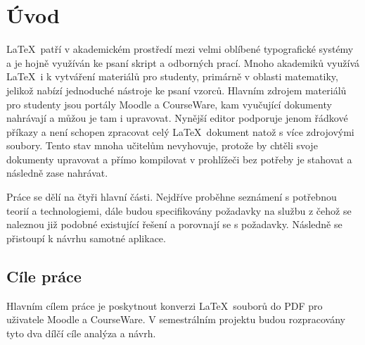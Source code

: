 \chapter{Úvod}
\LaTeX\ patří v akademickém prostředí mezi velmi oblíbené typografické systémy a je hojně využíván ke psaní skript a odborných prací. Mnoho akademiků využívá \LaTeX\ i k vytváření materiálů pro studenty, primárně v oblasti matematiky, jelikož nabízí jednoduché nástroje ke psaní vzorců. Hlavním zdrojem materiálů pro studenty jsou portály Moodle a CourseWare, kam vyučující dokumenty nahrávají a můžou je tam i upravovat. Nynější editor podporuje jenom řádkové příkazy a není schopen zpracovat celý \LaTeX\ dokument natož s více zdrojovými soubory. Tento stav mnoha učitelům nevyhovuje, protože by chtěli svoje dokumenty upravovat a přímo kompilovat v prohlížeči bez potřeby je stahovat a následně zase nahrávat. 

Práce se dělí na čtyři hlavní části. Nejdříve proběhne seznámení s potřebnou teorií a technologiemi, dále budou specifikovány požadavky na službu z čehož se naleznou již podobné existující řešení a porovnají se s požadavky. Následně se přistoupí k návrhu samotné aplikace.


\section{Cíle práce}
Hlavním cílem práce je poskytnout konverzi \LaTeX\ souborů do PDF pro uživatele Moodle a CourseWare. V semestrálním projektu budou rozpracovány tyto dva dílčí cíle analýza a návrh.
